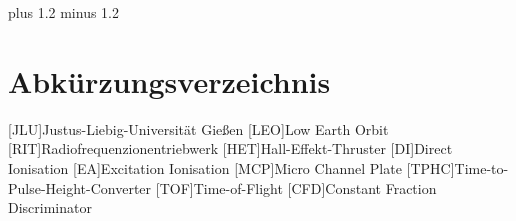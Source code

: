 \documentclass[fontsize=11pt,%
twoside,
BCOR          = 8mm]{scrreprt}
\author{Lorenz Saalmann}
\begin{document}
\noindent

\font plus 1.2\font
minus 1.2\font






\cleardoublepage

\tableofcontents
\cleardoublepage

\listoffigures
\listoftables
\chapter*{Abk\"{u}rzungsverzeichnis}
\begin{acronym}
[JLU]{\dotfill Justus-Liebig-Universit\"{a}t Gie{\ss}en}
[LEO]{\dotfill Low Earth Orbit}
[RIT]{\dotfill Radiofrequenzionentriebwerk}
[HET]{\dotfill Hall-Effekt-Thruster}
[DI]{\dotfill Direct Ionisation}
[EA]{\dotfill Excitation Ionisation}
[MCP]{\dotfill Micro Channel Plate}
[TPHC]{\dotfill Time-to-Pulse-Height-Converter}
[TOF]{\dotfill Time-of-Flight}
[CFD]{\dotfill Constant Fraction Discriminator}

\end{acronym}
\cleardoublepage

\onehalfspacing

\cleardoublepage


\cleardoublepage

\cleardoublepage

\cleardoublepage

\cleardoublepage


\fontsize{12pt}{12pt}\selectfont

\renewcommand\bibname{Literaturverzeichnis}
\clearpage
{}
{}

\printbibliography
\end{document}
